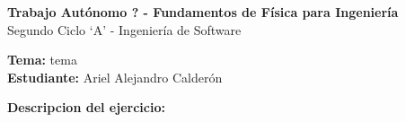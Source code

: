 \documentclass[answers]{exam}
\begin{document}
\begin{center}
	\large\textbf{Trabajo Autónomo ? - Fundamentos de Física para Ingeniería}\\[1em]
	\large Segundo Ciclo \enquote*{A} - Ingeniería de Software\\[1em]
\end{center}
\vspace{0.5cm}
\noindent
\large\textbf{Tema:} tema \\
\large\textbf{Estudiante:} Ariel Alejandro Calderón
\vspace{0.5cm}


\begin{questions}

	\question \large\textbf{Descripcion del ejercicio:}

	\vspace{0.5cm}

\end{questions}
\end{document}
